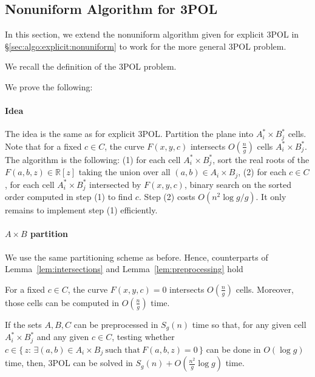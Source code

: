 \subsection{Nonuniform Algorithm for 3POL}%
\label{sec:algo:implicit:nonuniform}

In this section, we extend the nonuniform algorithm given for explicit 3POL in
\S\ref{sec:algo:explicit:nonuniform} to work for the more general 3POL
problem.

We recall the definition of the 3POL problem.
\ProblemPOLImplicit*

We prove the following:
\TheoremPOLNonuniformImplicit*

\paragraph{Idea}
The idea is the same as for explicit 3POL\@. Partition the plane
into $A^*_i \times B^*_j$ cells.
Note that for a fixed $c \in C$, the curve $F(x,y,c)$ intersects $O(\frac ng)$
cells $A^*_i \times B^*_j$. The algorithm is the following: (1) for each cell
$A^*_i \times B^*_j$, sort the real roots of the $F(a,b,z)
\in \mathbb{R}[z]$ taking the union over all $(a,b) \in A_i \times B_j$,
(2) for each $c \in C$,
for each cell $A^*_i \times B^*_j$ intersected by $F(x,y,c)$, binary search on
the sorted order computed in step (1) to find $c$. Step (2) costs $O(n^2
\log g / g)$. It only remains to implement step (1) efficiently.

\paragraph{$A \times B$ partition}
We use the same partitioning scheme as before. Hence, counterparts of
Lemma~\ref{lem:intersections}
and
Lemma~\ref{lem:preprocessing}
hold
\begin{lemma}\label{lem:intersections-implicit}
    For a fixed \(c \in C\), the curve $F(x,y,c)=0$ intersects $O(\frac ng)$ cells.
    Moreover, those cells can be computed in $O(\frac ng)$ time.
\end{lemma}
\begin{lemma}\label{lem:preprocessing-implicit}
    If the sets $A,B,C$ can be preprocessed in $S_g(n)$ time so that,
    for any given cell $A^*_i \times B^*_j$ and any given $c \in C$, testing whether
    $c \in \{\, z \colon\, \exists(a,b) \in A_i \times B_j~\text{such that}~F(a,b,z) = 0\,\}$
    can be done in
    $O(\log g)$ time, then, 3POL can be solved in
    $S_g(n)+O(\frac{n^2}{g}\log g)$ time.
\end{lemma}

